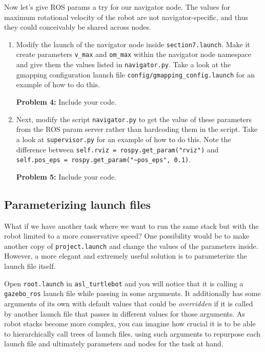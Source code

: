 \documentclass{article}
\begin{document}
Now let's give ROS params a try for our navigator node. The values for maximum rotational velocity of the robot are not navigator-specific, and thus they could conceivably be shared across nodes. 
\begin{enumerate}
    \item Modify the launch of the navigator node inside \texttt{section7.launch}. Make it create parameters \texttt{v\_max} and \texttt{om\_max} within the navigator node namespace and give them the values listed in \texttt{navigator.py}. Take a look at the gmapping configuration launch file \texttt{config/gmapping\_config.launch} for an example of how to do this.
    
    \textbf{Problem 4:} Include your code.
    
    \item Next, modify the script \texttt{navigator.py} to get the value of these parameters from the ROS param server rather than hardcoding them in the script. Take a look at \texttt{supervisor.py} for an example of how to do this. Note the difference between \lstinline{self.rviz = rospy.get_param("rviz")} and \\ \lstinline{self.pos_eps = rospy.get_param("~pos_eps", 0.1)}.
    
    \textbf{Problem 5:} Include your code.
\end{enumerate}  

\subsection{Parameterizing launch files}
What if we have another task where we want to run the same stack but with the robot limited to a more conservative speed? One possibility would be to make another copy of \texttt{project.launch} and change the values of the parameters inside. However, a more elegant and extremely useful solution is to parameterize the launch file itself.

Open \texttt{root.launch} in \texttt{asl\_turtlebot} and you will notice that it is calling a \texttt{gazebo\_ros} launch file while passing in some arguments. It additionally has some arguments of its own with default values that could be \textit{overridden} if it is called by another launch file that passes in different values for those arguments. As robot stacks become more complex, you can imagine how crucial it is to be able to hierarchically call trees of launch files, using such arguments to repurpose each launch file and ultimately parameters and nodes for the task at hand.
\end{document}
